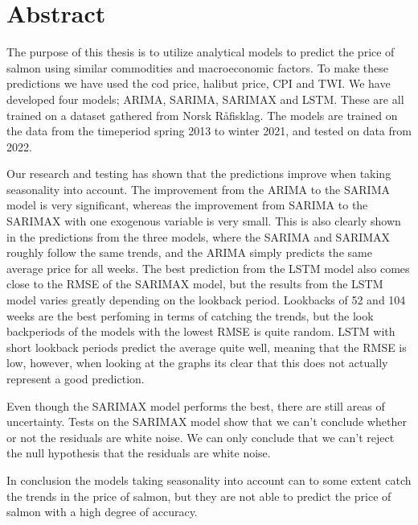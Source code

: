 \section*{Abstract}
The purpose of this thesis is to utilize analytical models to predict the price of salmon using similar commodities and macroeconomic factors. To make these predictions we have used the cod price, halibut price, CPI and TWI. We have developed four models; ARIMA, SARIMA, SARIMAX and LSTM. These are all trained on a dataset gathered from Norsk Råfisklag. The models are trained on the data from the timeperiod spring 2013 to winter 2021, and tested on data from 2022. 

Our research and testing has shown that the predictions improve when taking seasonality into account. The improvement from the ARIMA to the SARIMA model is very significant, whereas the improvement from SARIMA to the SARIMAX with one exogenous variable is very small. This is also clearly shown in the predictions from the three models, where the SARIMA and SARIMAX roughly follow the same trends, and the ARIMA simply predicts the same average price for all weeks. The best prediction from the LSTM model also comes close to the RMSE of the SARIMAX model, but the results from the LSTM model varies greatly depending on the lookback period. Lookbacks of 52 and 104 weeks are the best perfoming in terms of catching the trends, but the look backperiods of the models with the lowest RMSE is quite random. LSTM with short lookback periods predict the average quite well, meaning that the RMSE is low, however, when looking at the graphs its clear that this does not actually represent a good prediction. 

Even though the SARIMAX model performs the best, there are still areas of uncertainty. Tests on the SARIMAX model show that we can't conclude whether or not the residuals are white noise. We can only conclude that we can't reject the null hypothesis that the residuals are white noise.  

In conclusion the models taking seasonality into account can to some extent catch the trends in the price of salmon, but they are not able to predict the price of salmon with a high degree of accuracy. 